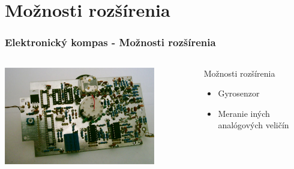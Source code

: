 \section{Možnosti rozšírenia}
\begin{snimka}
 \frametitle{Elektronický kompas - Možnosti rozšírenia}
   \begin{columns}[c]
    \begin{column}{0.6\textwidth}
     \begin{center}
        \includegraphics[width=0.8\textwidth]{obr/rozsirenie.jpg}
      \end{center}
    \end{column}
    \begin{column}{0.4\textwidth}
    \begin{block}{Možnosti rozšírenia}
    \begin{itemize}
         \item Gyrosenzor
         \item Meranie iných analógových veličín
	\end{itemize}
  \end{block}
        \end{column}
  \end{columns}
\end{snimka}